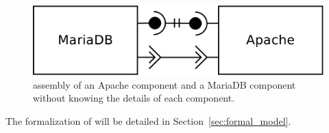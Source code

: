 \begin{figure}[tbp]
  \begin{center}
    \includegraphics[width=0.6\linewidth]{./images/simpleass.pdf}
  \end{center}
  \caption{\mad assembly of an Apache component and a MariaDB
    component without knowing the details of each component.}
  \label{fig:simple}
\end{figure}

The formalization of \mad will be detailed in
Section~\ref{sec:formal_model}.






